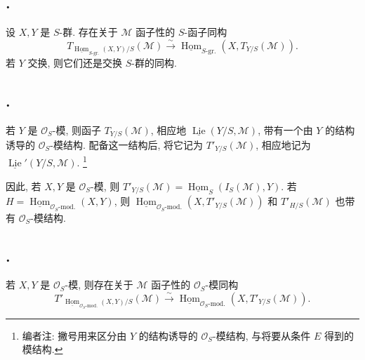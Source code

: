 \subsection*{.}
设 \(X,Y\) 是 \(S\)-群. 存在关于 \(\mathcal M\) 函子性的 \(S\)-函子同构
\[
 T_{\underline{\operatorname{Hom}}_{S\text{-gr.}}(X,Y)/S}
   (\mathcal M)
 \xrightarrow{\sim}
 \underline{\operatorname{Hom}}_{S\text{-gr.}}
   (X,T_{Y/S}(\mathcal M)).
\]
若 \(Y\) 交换, 则它们还是交换 \(S\)-群的同构.

\subsection*{.}
若 \(Y\) 是 \(\mathcal O_S\)-模, 则函子 \(T_{Y/S}(\mathcal M)\),
相应地 \(\underline{\operatorname{Lie}}(Y/S,\mathcal M)\),
带有一个由 \(Y\) 的结构诱导的 \(\mathcal O_S\)-模结构.
配备这一结构后, 将它记为 \(T'_{Y/S}(\mathcal M)\),
相应地记为 \(\underline{\operatorname{Lie}}'(Y/S,\mathcal M)\).
\footnote{编者注: 撇号用来区分由 \(Y\) 的结构诱导的 \(\mathcal O_S\)-模结构,
与将要从条件 \(E\) 得到的模结构.}

因此, 若 \(X,Y\) 是 \(\mathcal O_S\)-模, 则
\(T'_{Y/S}(\mathcal M)=
\underline{\operatorname{Hom}}_S(I_S(\mathcal M),Y)\).
若 \(H=\underline{\operatorname{Hom}}_{\mathcal O_S\text{-mod.}}(X,Y)\), 则
\(\underline{\operatorname{Hom}}_{\mathcal O_S\text{-mod.}}
(X,T'_{Y/S}(\mathcal M))\) 和 \(T'_{H/S}(\mathcal M)\)
也带有 \(\mathcal O_S\)-模结构.

\subsection*{.}
若 \(X,Y\) 是 \(\mathcal O_S\)-模, 则存在关于 \(\mathcal M\) 函子性的
\(\mathcal O_S\)-模同构
\[
 T'_{\underline{\operatorname{Hom}}_{\mathcal O_S\text{-mod.}}(X,Y)/S}
   (\mathcal M)
 \xrightarrow{\sim}
 \underline{\operatorname{Hom}}_{\mathcal O_S\text{-mod.}}
   (X,T'_{Y/S}(\mathcal M)).
\]

